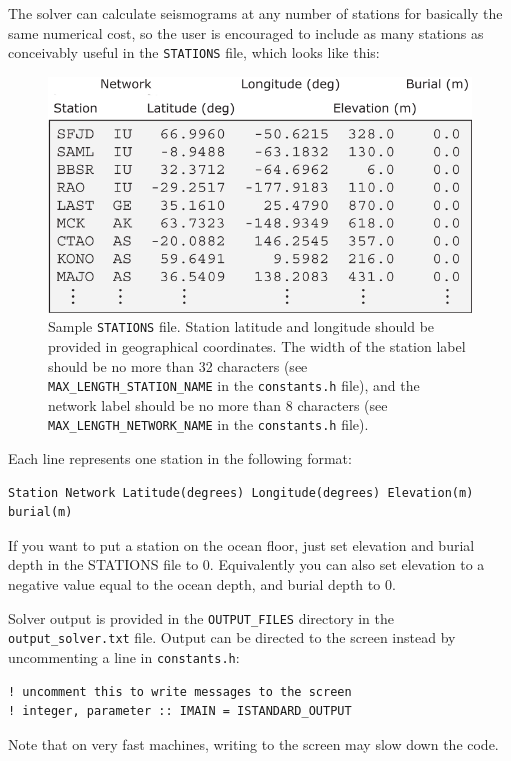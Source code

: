 \newpage
The solver can calculate seismograms at any number of stations for
basically the same numerical cost, so the user is encouraged to include
as many stations as conceivably useful in the \texttt{STATIONS} file,
which looks like this:
%
\begin{figure}[htp]
\begin{centering}
\includegraphics{figures/STATIONS_global_explained.pdf}
\end{centering}
%
\caption{Sample \texttt{STATIONS} file. Station latitude and longitude should
be provided in geographical coordinates. The width of the station
label should be no more than 32 characters (see \texttt{MAX\_LENGTH\_STATION\_NAME}
in the \texttt{constants.h} file), and the network label should be
no more than 8 characters (see \texttt{MAX\_LENGTH\_NETWORK\_NAME}
in the \texttt{constants.h} file).}
\end{figure}

Each line represents one station in the following format:
\begin{verbatim}
Station Network Latitude(degrees) Longitude(degrees) Elevation(m) burial(m)
\end{verbatim}
If you want to put a station on the ocean floor, just set
elevation and burial depth in the STATIONS file to 0.
Equivalently you can also set elevation to a negative value equal
to the ocean depth, and burial depth to 0.\newline


Solver output is provided in the \texttt{OUTPUT\_FILES} directory
in the \texttt{output\_solver.txt} file. Output can be directed to
the screen instead by uncommenting a line in \texttt{constants.h}:
{\small
\begin{verbatim}
! uncomment this to write messages to the screen
! integer, parameter :: IMAIN = ISTANDARD_OUTPUT
\end{verbatim}
}
Note that on very fast machines, writing to the screen may slow down
the code.\newline


